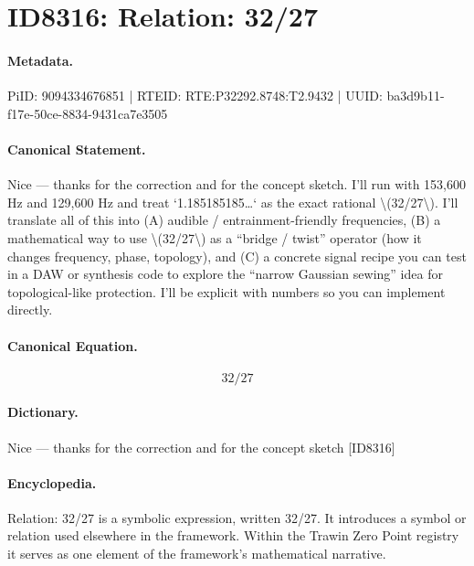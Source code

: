 \section*{ID8316: Relation: 32/27}
\paragraph{Metadata.}
PiID: 9094334676851 | RTEID: RTE:P32292.8748:T2.9432 | UUID: ba3d9b11-f17e-50ce-8834-9431ca7e3505

\paragraph{Canonical Statement.}
Nice — thanks for the correction and for the concept sketch. I’ll run with 153,600 Hz and 129,600 Hz and treat `1.185185185…` as the exact rational \textbackslash{}(32/27\textbackslash{}). I’ll translate all of this into (A) audible / entrainment-friendly frequencies, (B) a mathematical way to use \textbackslash{}(32/27\textbackslash{}) as a “bridge / twist” operator (how it changes frequency, phase, topology), and (C) a concrete signal recipe you can test in a DAW or synthesis code to explore the “narrow Gaussian sewing” idea for topological-like protection. I’ll be explicit with numbers so you can implement directly.

\paragraph{Canonical Equation.}
\[
32/27
\]

\paragraph{Dictionary.}
Nice — thanks for the correction and for the concept sketch [ID8316]

\paragraph{Encyclopedia.}
Relation: 32/27 is a symbolic expression, written 32/27. It introduces a symbol or relation used elsewhere in the framework. Within the Trawin Zero Point registry it serves as one element of the framework's mathematical narrative.
